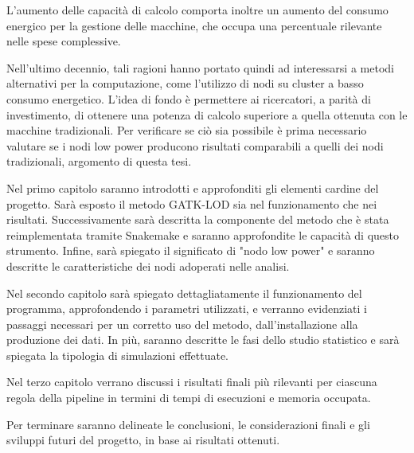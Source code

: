 \documentclass[12pt, a4paper]{report}
\begin{document}
L'aumento delle capacità di calcolo comporta inoltre un aumento del consumo energico per la gestione delle macchine, che occupa una percentuale rilevante nelle spese complessive.

Nell'ultimo decennio, tali ragioni hanno portato quindi ad interessarsi a metodi alternativi per la computazione, come l'utilizzo di nodi su cluster a basso consumo energetico.
L'idea di fondo è permettere ai ricercatori, a parità di investimento, di ottenere una potenza di calcolo superiore a quella ottenuta con le macchine tradizionali.
Per verificare se ciò sia possibile è prima necessario valutare se i nodi low power producono risultati comparabili a quelli dei nodi tradizionali, argomento di questa tesi.

Nel primo capitolo saranno introdotti e approfonditi gli elementi cardine del progetto. Sarà esposto il metodo GATK-LOD sia nel funzionamento che nei risultati. 
Successivamente sarà descritta la componente del metodo che è stata reimplementata tramite Snakemake e saranno approfondite le capacità di questo strumento.
Infine, sarà spiegato il significato di "nodo low power" e saranno descritte le caratteristiche dei nodi adoperati nelle analisi.

Nel secondo capitolo sarà spiegato dettagliatamente il funzionamento del programma, approfondendo i parametri utilizzati, e verranno evidenziati i passaggi necessari per un corretto uso del metodo, dall'installazione alla produzione dei dati.
In più, saranno descritte le fasi dello studio statistico e sarà spiegata la tipologia di simulazioni effettuate.

Nel terzo capitolo verrano discussi i risultati finali più rilevanti per ciascuna regola della pipeline in termini di tempi di esecuzioni e memoria occupata. 

Per terminare saranno delineate le conclusioni, le considerazioni finali e gli sviluppi futuri del progetto, in base ai risultati ottenuti.


\tableofcontents
{}

\newpage
\
\newpage







\end{document}
